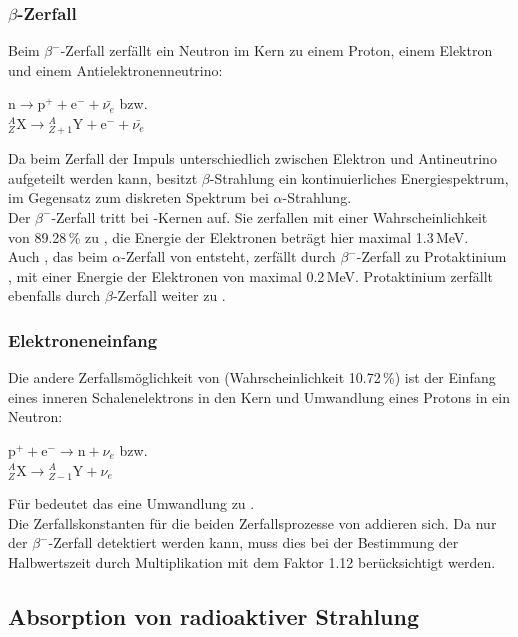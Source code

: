 \subsubsection{$\beta$-Zerfall}
Beim $\beta^-$-Zerfall zerfällt ein Neutron im Kern zu einem Proton, einem Elektron und einem
Antielektronenneutrino:
\begin{center}
$\text{n} \rightarrow \text{p}^+ + \text{e}^- +\bar{\nu_e}$ bzw.\\[0.15cm]
${}^{A}_{Z}\text{X} \rightarrow {}^{A}_{Z+1}\text{Y} + \text{e}^- + \bar{\nu_e}$
\end{center}
Da beim Zerfall der Impuls unterschiedlich zwischen Elektron und Antineutrino aufgeteilt werden kann,
besitzt $\beta$-Strahlung ein kontinuierliches Energiespektrum, im Gegensatz zum diskreten Spektrum
bei $\alpha$-Strahlung.\\
Der $\beta^-$-Zerfall tritt bei -Kernen auf.
Sie zerfallen mit einer Wahrscheinlichkeit von 89.28\,\% zu ,
die Energie der Elektronen beträgt hier maximal 1.3\,MeV.\\
Auch , das beim $\alpha$-Zerfall von  entsteht,
zerfällt durch $\beta^-$-Zerfall zu Protaktinium ,
mit einer Energie der Elektronen von maximal 0.2\,MeV.
Protaktinium zerfällt ebenfalls durch $\beta$-Zerfall weiter zu .

\subsubsection{Elektroneneinfang}
Die andere Zerfallsmöglichkeit von  (Wahrscheinlichkeit 10.72\,\%)
ist der Einfang eines inneren Schalenelektrons
in den Kern und Umwandlung eines Protons in ein Neutron:
\begin{center}
$\text{p}^+ + \text{e}^- \rightarrow \text{n} + \nu_e$ bzw.\\[0.15cm]
${}^{A}_{Z}\text{X} \rightarrow {}^{A}_{Z-1}\text{Y} + \nu_e$
\end{center}
Für  bedeutet das eine Umwandlung zu .\\
Die Zerfallskonstanten für die beiden Zerfallsprozesse von  addieren sich.
Da nur der $\beta^-$-Zerfall detektiert werden kann, muss dies bei der Bestimmung der
Halbwertszeit durch Multiplikation mit dem Faktor 1.12 berücksichtigt werden.

\subsection{Absorption von radioaktiver Strahlung}
